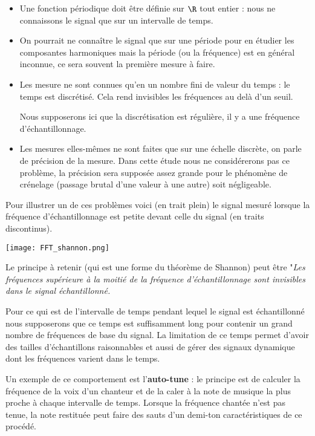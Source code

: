 \begin{itemize}
\item Une fonction périodique doit être définie sur $\R$ tout entier : nous ne connaissons le signal que sur un
intervalle de temps.
\item On pourrait ne connaître le signal que sur une période pour en étudier les composantes harmoniques mais la période
(ou la fréquence) est en général inconnue, ce sera souvent la première mesure à faire.
\item Les mesure ne sont connues qu'en un nombre fini de valeur du temps : le temps est discrétisé. Cela rend
invisibles les fréquences au delà d'un seuil.

Nous supposerons ici que la discrétisation est régulière, il y a une fréquence d’échantillonnage.
\item Les mesures elles-mêmes ne sont faites que sur une échelle discrète, on parle de précision de la mesure.
Dans cette étude nous ne considérerons pas ce problème, la précision sera supposée assez grande pour le phénomène de
crénelage (passage brutal d'une valeur à une autre) soit négligeable.
\end{itemize}

Pour illustrer un de ces problèmes voici (en trait plein) le signal mesuré lorsque
la fréquence d'échantillonnage est petite devant celle du signal (en traits discontinus).
\begin{center}
    \texttt{[image: FFT\_shannon.png]}
  \end{center}
Le principe à retenir (qui est une forme du théorème de Shannon) peut être
"{\it Les  fréquences supérieure à la moitié de la fréquence d'échantillonnage sont invisibles dans le signal
échantillonné.}

\medskip

Pour ce qui est de l'intervalle de temps pendant lequel le signal est échantillonné nous supposerons que ce temps est
suffisamment long pour contenir un grand nombre de fréquences de base du signal. La limitation de ce temps permet
d'avoir des tailles d'échantillons raisonnables et aussi de gérer des signaux dynamique dont les fréquences varient dans
le temps.

Un exemple de ce comportement est l'{\bf auto-tune} : le principe est de calculer la fréquence de la voix d'un chanteur
et de la caler à la note de musique la plus proche à chaque intervalle de temps. Lorsque la fréquence chantée n'est pas tenue, la note restituée peut faire des sauts d'un demi-ton caractéristiques de ce procédé.

